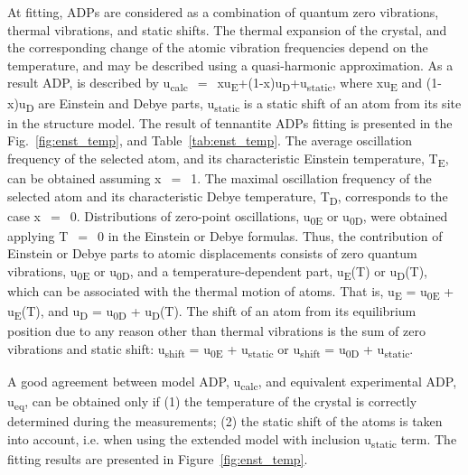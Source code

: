 \documentclass[preprint,review,12pt]{elsarticle}
\begin{document}
At fitting, ADPs are considered as a combination of quantum zero vibrations, thermal vibrations, and static shifts\cite{Trueblood1996,Bentien2005,Nakatsuka2011}.
The thermal expansion of the crystal, and the corresponding change of the atomic vibration frequencies depend on the temperature, and may be described using a quasi-harmonic approximation\cite{willis1975thermal,Bentien2005}.
As a result ADP, is described by u\textsubscript{calc}~$=$~xu\textsubscript{E}+(1-x)u\textsubscript{D}+u\textsubscript{static}, where xu\textsubscript{E} and (1-x)u\textsubscript{D} are Einstein and Debye parts, u\textsubscript{static} is a static shift of an atom from its site in the structure model\cite{Dudka2019}.
The result of tennantite ADPs fitting is presented in the Fig.~\ref{fig:enst_temp}, and Table~\ref{tab:enst_temp}.
The average oscillation frequency of the selected atom, and its characteristic Einstein temperature, T\textsubscript{E}, can be obtained  assuming x~$=$~1.
The maximal oscillation frequency of the selected atom and its characteristic Debye temperature, T\textsubscript{D}, corresponds to the case x~$=$~0.
Distributions of zero-point oscillations, u\textsubscript{0E} or u\textsubscript{0D}, were obtained applying T~$=$~0 in the Einstein or Debye formulas.
Thus, the contribution of Einstein or Debye parts to atomic displacements consists of zero quantum vibrations, u\textsubscript{0E} or u\textsubscript{0D}, and a temperature-dependent part, u\textsubscript{E}(T) or u\textsubscript{D}(T), which can be associated with the thermal motion of atoms.
That is, u\textsubscript{E} = u\textsubscript{0E} + u\textsubscript{E}(T), and u\textsubscript{D} = u\textsubscript{0D} + u\textsubscript{D}(T). The shift of an atom from its equilibrium position due to any reason other than thermal vibrations is the sum of zero vibrations and static shift: u\textsubscript{shift} = u\textsubscript{0E} + u\textsubscript{static} or u\textsubscript{shift} = u\textsubscript{0D} + u\textsubscript{static}\cite{Dudka2019}.

A good agreement between model ADP, u\textsubscript{calc}, and equivalent experimental ADP, u\textsubscript{eq}, can be obtained only if (1) the temperature of the crystal is correctly determined during the measurements; (2) the static shift of the atoms is taken into account, i.e. when using the extended model with  inclusion u\textsubscript{static} term. The fitting results are presented in Figure~\ref{fig:enst_temp}.
\end{document}
